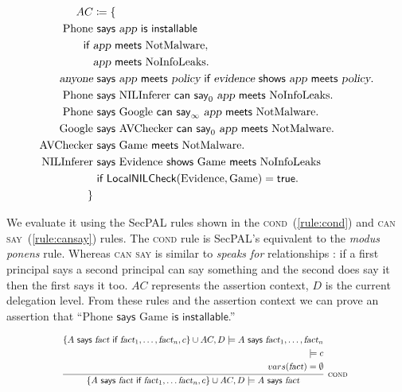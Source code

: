\documentclass[]{llncs}
\newcommand{\keyword}[1]{\textsf{#1}}
\newcommand{\entity}[1]{\textrm{#1}}
\newcommand{\vari}[1]{\textsl{#1}}
\newcommand{\says}{\keyword{~says~}}
\newcommand{\cansay}[1]{\keyword{~can say}_{#1}~}
\newcommand{\iffacts}{\keyword{~if~}}
\newcommand{\meets}{\keyword{~meets~}}
\newcommand{\shows}{\keyword{~shows~}}
\newcommand{\installable}{\keyword{~is installable}}
\newcommand{\Phone}{\entity{Phone}}
\newcommand{\Nll}{\entity{NoInfoLeaks}}
\newcommand{\Nlli}{\entity{NILInferer}}
\newcommand{\Nm}{\entity{NotMalware}}
\newcommand{\Avc}{\entity{AVChecker}}
\newcommand{\Google}{\entity{Google}}
\newcommand{\App}{\entity{Game}}
\newcommand{\Evi}{\entity{Evidence}}
\newcommand{\LocalChecks}[2]{\textsf{Local#2Check}{\left(#1\right)}}
\newcommand{\app}{\vari{app}}
\newcommand{\policy}{\vari{policy}}
\newcommand{\evi}{\vari{evidence}}
\newcommand{\fact}{\vari{fact}}
\newcommand{\rrule}[1]{\textsc{\small #1}}
\newcommand{\rcond}[1]{\rrule{cond #1}}
\newcommand{\eref}[1]{(\ref{#1})}
\begin{document}
\begin{align}
    AC & \coloneqq \left\{ \right. \nonumber\\
    \Phone&\says \app\installable \nonumber\\
    \iffacts&\app\meets\Nm, \nonumber\\
            &\app\meets\Nll.
  \label{sp:DevicePolicy}\\
  \vari{anyone}&\says \app\meets\policy \iffacts \evi\shows\app\meets\policy.
  \label{sp:showsmeets}\\
    \Phone&\says\Nlli\cansay 0\app\meets\Nll.
  \label{sp:NlliCanSayNll}\\
    \Phone&\says
    \Google\cansay\infty
    \app\meets\Nm.
  \label{sp:GoogleCanSayNm}\\
    \Google&\says\Avc\cansay 0\app\meets\Nm.
  \label{sp:AvcCanSayNm}\\
    \Avc&\says\App\meets\Nm.
  \label{sp:AvcSaysNm}\\
    \Nlli&\says\Evi\shows\App\meets\Nll \nonumber\\
         & \iffacts \LocalChecks{\Evi,  \App}{NIL}=\textsf{true}.
  \label{sp:NlliSaysEviShowsAppPol}\\
  \left.\right\}\nonumber
\end{align}

We evaluate it using the SecPAL rules shown in the
\textsc{cond}~\eref{rule:cond} and \textsc{can say}~\eref{rule:cansay} rules.
The \textsc{cond} rule is SecPAL's equivalent to the \emph{modus ponens} rule.
Whereas \textsc{can say} is similar to \emph{speaks for} relationships
\cite{Abadi:2003kta}:  if a first principal says a second principal can say
something and the second does say it then the first says it too. $AC$
represents the assertion context, $D$ is the current delegation level. From
these rules and the assertion context we can prove an assertion that
``\(\Phone\says\App\installable\).''

\begin{equation}
  \scalebox{0.8}{%
  \infer[\rcond{}]{%
    \left\{A\says\fact\iffacts\fact_1,  \dots\fact_n,  c\right\}\cup AC,  D \models
      A\says\fact
  }{%
    \begin{split}
    \left\{A\says\fact\iffacts\fact_1,  \dots,  \fact_n,  c\right\}\cup AC,  D \models
      A\says\fact_1,  \dots,  \fact_n \\
    \models c \\
    vars(\fact) = \emptyset
    \end{split}
  }}
  \label{rule:cond}\\
\end{equation}
\end{document}
